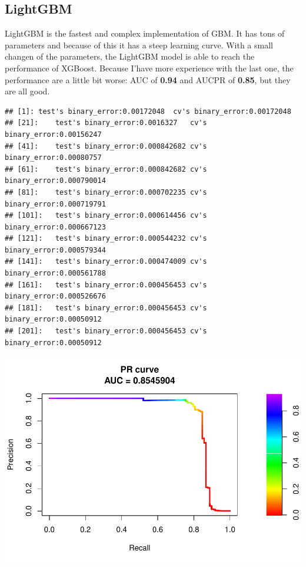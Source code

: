 \documentclass[]{article}
\begin{document}
\newpage

\hypertarget{lightgbm}{%
\subsection{LightGBM}\label{lightgbm}}

LightGBM is the fastest and complex implementation of GBM. It has tons
of parameters and because of this it has a steep learning curve. With a
small changen of the parameters, the LightGBM model is able to reach the
performance of XGBoost. Because I'have more experience with the last
one, the performance are a little bit worse: AUC of \textbf{0.94} and
AUCPR of \textbf{0.85}, but they are all good.

\begin{verbatim}
## [1]: test's binary_error:0.00172048  cv's binary_error:0.00172048 
## [21]:    test's binary_error:0.0016327   cv's binary_error:0.00156247 
## [41]:    test's binary_error:0.000842682 cv's binary_error:0.00080757 
## [61]:    test's binary_error:0.000842682 cv's binary_error:0.000790014 
## [81]:    test's binary_error:0.000702235 cv's binary_error:0.000719791 
## [101]:   test's binary_error:0.000614456 cv's binary_error:0.000667123 
## [121]:   test's binary_error:0.000544232 cv's binary_error:0.000579344 
## [141]:   test's binary_error:0.000474009 cv's binary_error:0.000561788 
## [161]:   test's binary_error:0.000456453 cv's binary_error:0.000526676 
## [181]:   test's binary_error:0.000456453 cv's binary_error:0.00050912 
## [201]:   test's binary_error:0.000456453 cv's binary_error:0.00050912
\end{verbatim}

\begin{center}\includegraphics{Credit_Card_Fraud_Detection_Project_Report_files/figure-latex/unnamed-chunk-23-1} \end{center}
\end{document}
